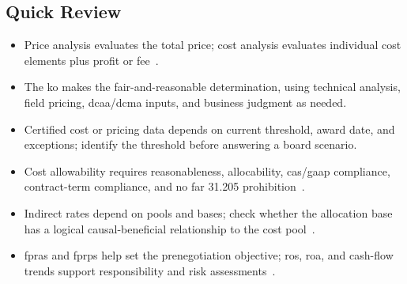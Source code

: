 \documentclass[../main.tex]{subfiles}
\begin{document}
\subsection{Quick Review}
\begin{itemize}
  \item Price analysis evaluates the total price; cost analysis evaluates individual cost elements plus profit or fee~\autocite{FAR-15-404-1-Proposal-Analysis}.
  \item The \ac{ko} makes the fair-and-reasonable determination, using technical analysis, field pricing, \ac{dcaa}/\ac{dcma} inputs, and business judgment as needed.
  \item Certified cost or pricing data depends on current threshold, award date, and exceptions; identify the threshold before answering a board scenario.
  \item Cost allowability requires reasonableness, allocability, \ac{cas}/\ac{gaap} compliance, contract-term compliance, and no \ac{far} 31.205 prohibition~\autocite{FAR-31-201-2-Allowability,FAR-31-205-Selected-Costs}.
  \item Indirect rates depend on pools and bases; check whether the allocation base has a logical causal-beneficial relationship to the cost pool~\autocite{FAR-31-203-Indirect-Costs}.
  \item \acp{fpra} and \acp{fprp} help set the prenegotiation objective; \ac{ros}, \ac{roa}, and cash-flow trends support responsibility and risk assessments~\autocite{edo-3-2-4-cost-price-evaluation-2025,FAR-15-406-1-Prenegotiation-Objectives,FAR-15-407-3-FPRA}.
\end{itemize}

\end{document}
